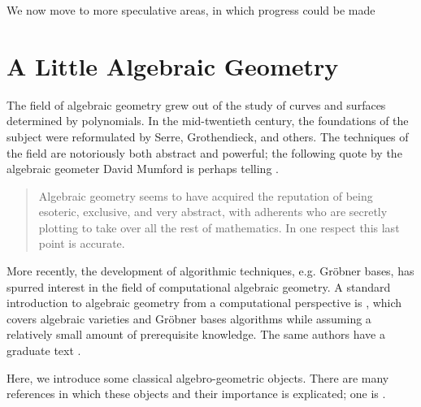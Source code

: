 \documentclass[11pt,titlepage]{article}
\numberwithin{equation}{section}
\begin{document}
    We now move to more speculative areas, in which progress could be made

    





\appendix

\section{A Little Algebraic Geometry}

    The field of algebraic geometry grew out of the study of curves and surfaces
    determined by polynomials.  In the mid-twentieth century, the foundations of
    the subject were reformulated by Serre, Grothendieck, and others.  The
    techniques of the field are notoriously both abstract and powerful; the
    following quote by the algebraic geometer David Mumford is perhaps telling
    \cite{Mum99}.
    \begin{quote}
        Algebraic geometry seems to have acquired the reputation of being
        esoteric, exclusive, and very abstract, with adherents who are secretly
        plotting to take over all the rest of mathematics.  In one respect this
        last point is accurate.
    \end{quote}
    More recently, the development of algorithmic techniques, e.g. Gröbner
    bases, has spurred interest in the field of computational algebraic
    geometry.  A standard introduction to algebraic geometry from a
    computational perspective is \cite{CLO97}, which covers algebraic varieties
    and Gröbner bases algorithms while assuming a relatively small amount of
    prerequisite knowledge.  The same authors have a graduate text \cite{CLO05}.

    Here, we introduce some classical algebro-geometric objects.  There are many
    references in which these objects and their importance is explicated; one is
    \cite{Sha}.
\end{document}
